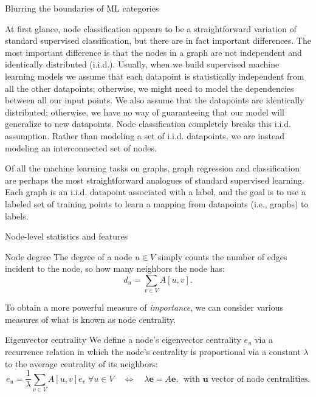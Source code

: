 \documentclass[10pt, aspectratio=169, compress, protectframetitle, handout]{beamer}
\begin{document}
\begin{frame}{Blurring the boundaries of ML categories}

    At first glance, node classification appears to be a straightforward variation of standard supervised classification, but there are in fact important differences. The most important difference is that the nodes in a graph are not independent and identically distributed (i.i.d.). Usually, when we build supervised machine learning models we assume that each datapoint is statistically independent from all the other datapoints; otherwise, we might need to model the dependencies between all our input points. We also assume that the datapoints are identically distributed; otherwise, we have no way of guaranteeing that our model will generalize to new datapoints. Node classification completely breaks this i.i.d. assumption. Rather than modeling a set of i.i.d. datapoints, we are instead modeling an interconnected set of nodes.
    
    Of all the machine learning tasks on graphs, graph regression and classification are perhaps the most straightforward analogues of standard supervised learning. Each graph is an i.i.d. datapoint associated with a label, and the goal is to use a labeled set of training points to learn a mapping from datapoints (i.e., graphs) to labels.
    
\end{frame}


\begin{frame}{Node-level statistics and features}

    \begin{block}{Node degree}
        The \alert{degree} of a node $u \in V$ simply counts the number of edges incident to the node, so how many neighbors the node has:
        \begin{equation}
            d_u = \sum_{v \in V} A[u, v].
            \label{eq:degree}
        \end{equation}
    \end{block}
    
    To obtain a more powerful measure of \emph{importance}, we can consider various measures of what is known as \alert{node centrality}.
    
    \begin{block}{Eigenvector centrality}
        We define a node's \alert{eigenvector centrality} $e_u$ via a recurrence relation in which the node's centrality is proportional via a constant $\lambda$ to the average centrality of its neighbors:
        \begin{equation}
            e_u = \frac1\lambda \sum_{v \in V} A[u, v] e_v \; \forall u \in V \quad \Longleftrightarrow \quad \lambda \mathbf e = A \mathbf e. \; \text{ with }\mathbf u \text{ vector of node centralities}.
            \label{eq:eigencentr}
        \end{equation}
    \end{block}
    
\end{frame}
\end{document}
